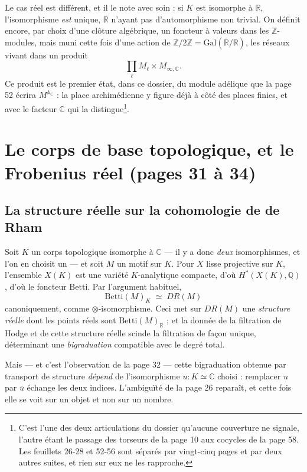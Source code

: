 \documentclass[11pt,a4paper]{article}
\begin{document}
Le cas réel est différent, et il le note avec soin : si $K$ est isomorphe à
$\mathbb{R}$, l'isomorphisme \emph{est} unique, $\mathbb{R}$ n'ayant pas
d'automorphisme non trivial. On définit encore, par choix d'une clôture
algébrique, un foncteur à valeurs dans les $\mathbb{Z}$-modules, mais muni cette
fois d'une action de $\mathbb{Z}/2\mathbb{Z} = \mathrm{Gal}(\overline{\mathbb{R}}/\mathbb{R})$,
les réseaux vivant dans un produit
\[
  \prod_{\ell} M_{\ell} \times M_{\infty, \mathbb{C}} .
\]
Ce produit est le premier état, dans ce dossier, du module adélique que la
page 52 écrira $M^{\mathbb{A}_{\mathbb{C}}}$ : la place archimédienne y figure
déjà à côté des places finies, et avec le facteur $\mathbb{C}$ qui la
distingue\footnote{C'est l'une des deux articulations du dossier qu'aucune
couverture ne signale, l'autre étant le passage des torseurs de la page 10 aux
cocycles de la page 58. Les feuillets 26-28 et 52-56 sont séparés par vingt-cinq
pages et par deux autres suites, et rien sur eux ne les rapproche.}.

\section*{Le corps de base topologique, et le Frobenius réel (pages 31 à 34)}

\subsection*{La structure réelle sur la cohomologie de de Rham}

Soit $K$ un corps topologique isomorphe à $\mathbb{C}$ — il y a donc \emph{deux}
isomorphismes, et l'on en choisit un — et soit $M$ un motif sur $K$. Pour $X$
lisse projective sur $K$, l'ensemble $X(K)$ est une variété $K$-analytique
compacte, d'où $H^{*}(X(K), \mathbb{Q})$, d'où le foncteur $\mathrm{Betti}$. Par
l'argument habituel,
\[
  \mathrm{Betti}(M)_{K} \;\simeq\; DR(M)
\]
canoniquement, comme $\otimes$-isomorphisme. Ceci met sur $DR(M)$ une
\emph{structure réelle} dont les points réels sont
$\mathrm{Betti}(M)_{\mathbb{R}}$ ; et la donnée de la filtration de Hodge et de
cette structure réelle scinde la filtration de façon unique, déterminant une
\emph{bigraduation} compatible avec le degré total.

Mais — et c'est l'observation de la page 32 — cette bigraduation obtenue par
transport de structure \emph{dépend} de l'isomorphisme $u \colon K \simeq
\mathbb{C}$ choisi : remplacer $u$ par $\bar{u}$ échange les deux indices.
L'ambiguïté de la page 26 reparaît, et cette fois elle se voit sur un objet et
non sur un nombre.
\end{document}
